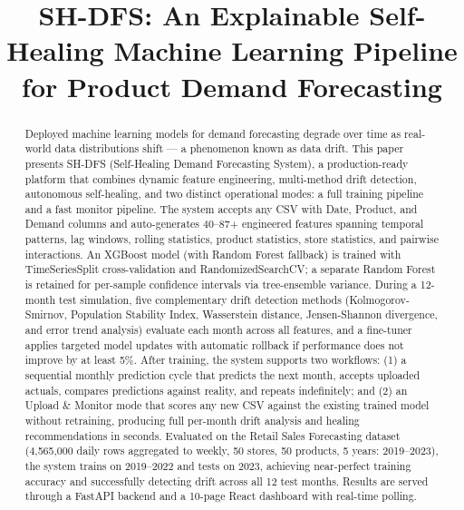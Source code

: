 \documentclass[conference]{IEEEtran}
\begin{document}
\title{SH-DFS: An Explainable Self-Healing Machine Learning Pipeline for Product Demand Forecasting}

\author{
\and
{}
}

\maketitle

\begin{abstract}
Deployed machine learning models for demand forecasting degrade over time as real-world data distributions shift — a phenomenon known as data drift. This paper presents SH-DFS (Self-Healing Demand Forecasting System), a production-ready platform that combines dynamic feature engineering, multi-method drift detection, autonomous self-healing, and two distinct operational modes: a full training pipeline and a fast monitor pipeline. The system accepts any CSV with Date, Product, and Demand columns and auto-generates 40--87+ engineered features spanning temporal patterns, lag windows, rolling statistics, product statistics, store statistics, and pairwise interactions. An XGBoost model (with Random Forest fallback) is trained with TimeSeriesSplit cross-validation and RandomizedSearchCV; a separate Random Forest is retained for per-sample confidence intervals via tree-ensemble variance. During a 12-month test simulation, five complementary drift detection methods (Kolmogorov-Smirnov, Population Stability Index, Wasserstein distance, Jensen-Shannon divergence, and error trend analysis) evaluate each month across all features, and a fine-tuner applies targeted model updates with automatic rollback if performance does not improve by at least 5\%. After training, the system supports two workflows: (1) a sequential monthly prediction cycle that predicts the next month, accepts uploaded actuals, compares predictions against reality, and repeats indefinitely; and (2) an Upload \& Monitor mode that scores any new CSV against the existing trained model without retraining, producing full per-month drift analysis and healing recommendations in seconds. Evaluated on the Retail Sales Forecasting dataset (4,565,000 daily rows aggregated to weekly, 50 stores, 50 products, 5 years: 2019--2023), the system trains on 2019--2022 and tests on 2023, achieving near-perfect training accuracy and successfully detecting drift across all 12 test months. Results are served through a FastAPI backend and a 10-page React dashboard with real-time polling.
\end{abstract}
\end{document}
